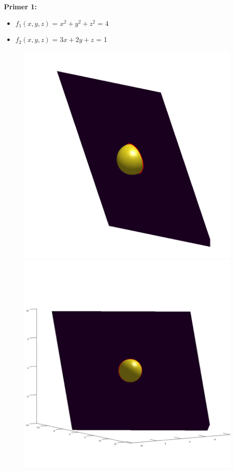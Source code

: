 \documentclass[12pt]{article}
\begin{document}
	\begin{minipage}{\textwidth}
	\textbf{\large{Primer 1:}}
	\begin{itemize} 
		\item $f_{1}(x,y,z)$ = $x^2 + y^2 + z^2$ = 4
		\item $f_{2}(x,y,z)$ = $3x + 2y + z$ = 1	
	\end{itemize}
	\begin{figure}[H]
	    \centering
    	\includegraphics[scale=0.3]{primer1_1}
    	\includegraphics[scale=0.3]{primer1_2}
    \end{figure}
    \end{minipage}
    
\end{document}
